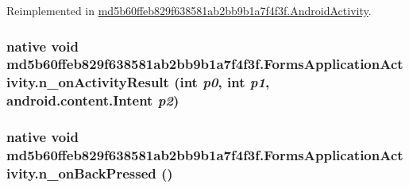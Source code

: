 Reimplemented in \hyperlink{classmd5b60ffeb829f638581ab2bb9b1a7f4f3f_1_1_android_activity_5b7d4be6ba547abcf4a46221f65a8eb6}{md5b60ffeb829f638581ab2bb9b1a7f4f3f.AndroidActivity}.\hypertarget{classmd5b60ffeb829f638581ab2bb9b1a7f4f3f_1_1_forms_application_activity_a1c5897431d89f265b491c980b75174c}{
\subsubsection[{n\_\-onActivityResult}]{\setlength{\rightskip}{0pt plus 5cm}native void md5b60ffeb829f638581ab2bb9b1a7f4f3f.FormsApplicationActivity.n\_\-onActivityResult (int {\em p0}, \/  int {\em p1}, \/  android.content.Intent {\em p2})}}
\label{classmd5b60ffeb829f638581ab2bb9b1a7f4f3f_1_1_forms_application_activity_a1c5897431d89f265b491c980b75174c}


\hypertarget{classmd5b60ffeb829f638581ab2bb9b1a7f4f3f_1_1_forms_application_activity_ac3983f4085466646a1bef286ee44d22}{
\subsubsection[{n\_\-onBackPressed}]{\setlength{\rightskip}{0pt plus 5cm}native void md5b60ffeb829f638581ab2bb9b1a7f4f3f.FormsApplicationActivity.n\_\-onBackPressed ()}}
\label{classmd5b60ffeb829f638581ab2bb9b1a7f4f3f_1_1_forms_application_activity_ac3983f4085466646a1bef286ee44d22}


